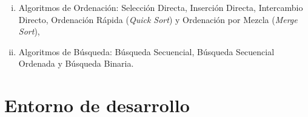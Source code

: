 \begin{enumerate}[I.]
\begin{enumerate}[i.]

\item {}Algoritmos de Ordenación: Selección Directa, Inserción Directa, 
Intercambio Directo, Ordenación Rápida (\textit{Quick Sort}) y Ordenación por 
Mezcla (\textit{Merge Sort}), 

\item {}Algoritmos de Búsqueda: Búsqueda Secuencial, Búsqueda Secuencial Ordenada 
y Búsqueda Binaria. 

\end{enumerate}

\end{enumerate}





\section{Entorno de desarrollo}

